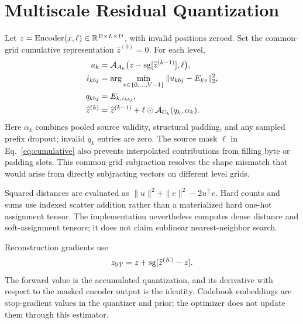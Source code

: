 \documentclass[11pt,a4paper]{article}
\begin{document}
\section{Multiscale Residual Quantization}
Let \(z=\operatorname{Encoder}(x,\ell)\in\mathbb{R}^{B\times L\times D}\), with invalid
positions zeroed. Set the common-grid cumulative representation
\(\widehat z^{(0)}=0\). For each level,
\begin{align}
 u_k&=\mathcal{A}_{A_k}\bigl(z-\operatorname{sg}[\widehat z^{(k-1)}],\ell\bigr),
 \label{eq:residual}\\
 i_{kbj}&=\arg\min_{v\in\{0,\ldots,V-1\}}
       \|u_{kbj}-E_{kv}\|_2^2,\\
 q_{kbj}&=E_{k,i_{kbj}},\\
 \widehat z^{(k)}&=\widehat z^{(k-1)}+
       \ell\odot\mathcal{A}_{U_k}(q_k,\alpha_k).
 \label{eq:cumulative}
\end{align}
Here \(\alpha_k\) combines pooled source validity, structural padding, and any
sampled prefix dropout; invalid \(q_k\) entries are zero. The source mask
\(\ell\) in Eq.~\eqref{eq:cumulative} also prevents interpolated contributions
from filling byte or padding slots. This common-grid subjraction resolves the
shape mismatch that would arise from directly subjracting vectors on different
level grids.

Squared distances are evaluated as
\(\|u\|^2+\|e\|^2-2u^\top e\). Hard counts and sums use indexed scatter
addition rather than a materialized hard one-hot assignment tensor. The
implementation nevertheless computes dense distance and soft-assignment
tensors; it does not claim sublinear nearest-neighbor search.

Reconstruction gradients use
\begin{equation}
 z_{\mathrm{ST}}=z+\operatorname{sg}[\widehat z^{(K)}-z].
 \label{eq:st}
\end{equation}
The forward value is the accumulated quantization, and its derivative with
respect to the masked encoder output is the identity. Codebook embeddings are
stop-gradient values in the quantizer and prior; the optimizer does not update
them through this estimator.
\end{document}
